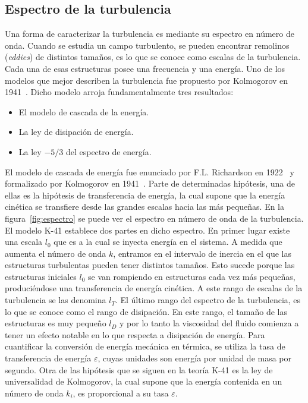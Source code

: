 \subsection{Espectro de la turbulencia}
Una forma de caracterizar la turbulencia es mediante su espectro en número de onda.
Cuando se estudia un campo turbulento, se pueden encontrar remolinos (\textit{eddies}) de distintos
tamaños, es lo que se conoce como escalas de la turbulencia. Cada una de esas estructuras
posee una frecuencia y una energía.
Uno de los modelos que mejor describen la turbulencia fue propuesto por Kolmogorov en
1941~\cite{20000584634}. Dicho modelo arroja fundamentalmente tres resultados:
\begin{itemize}
    \item El modelo de cascada de la energía.
    \item La ley de disipación de energía.
    \item La ley $-5/3$ del espectro de energía.
\end{itemize}
El modelo de cascada de energía fue enunciado por F.L. Richardson en 1922~\cite{richardson_lynch_2007} y formalizado
por Kolmogorov en 1941~\cite{20000584634}. Parte de determinadas hipótesis, una de ellas es la hipótesis de
transferencia de energía, la cual supone que la energía cinética se transfiere desde las grandes
escalas hacia las más pequeñas.
En la figura~\ref{fig:espectro} se puede ver el espectro en número de onda de la turbulencia. El modelo
K-41 establece dos partes en dicho espectro. En primer lugar existe una escala $l_0$ que es a la
cual se inyecta energía en el sistema.
A medida que aumenta el número de onda $k$, entramos en el intervalo de inercia en el que
las estructuras turbulentas pueden tener distintos tamaños. Esto sucede porque las estructuras
iniciales $l_0$ se van rompiendo en estructuras cada vez más pequeñas, produciéndose una
transferencia de energía cinética. A este rango de escalas de la turbulencia se las denomina
$l_T$. El último rango del espectro de la turbulencia, es lo que se conoce como el rango de
disipación. En este rango, el tamaño de las estructuras es muy pequeño $l_D$ y por lo tanto la
viscosidad del fluido comienza a tener un efecto notable en lo que respecta a disipación de
energía. Para cuantificar la conversión de energía mecánica en térmica, se utiliza la tasa de
transferencia de energía $\varepsilon$, cuyas unidades son energía por unidad de masa por segundo.
Otra de las hipótesis que se siguen en la teoría K-41 es la ley de universalidad de Kolmogorov,
la cual supone que la energía contenida en un número de onda $k_i$, es proporcional a su tasa $\varepsilon$. 
